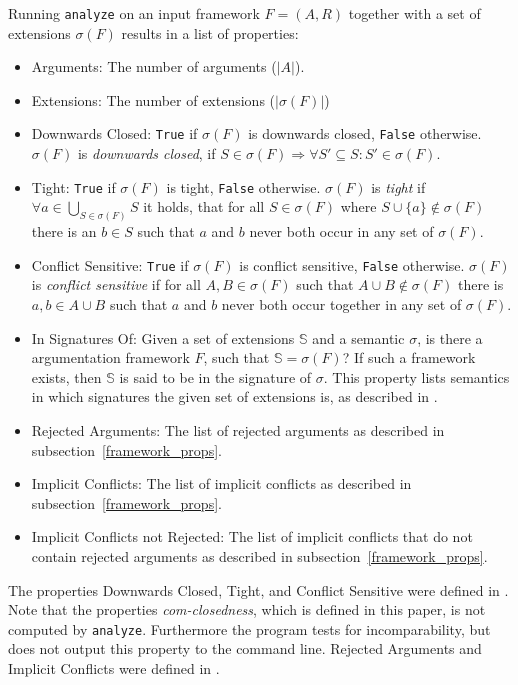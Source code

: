 \documentclass[parskip=half]{scrartcl}
\begin{document}
Running \texttt{analyze} on an input framework $F=(A,R)$ together with a set of
extensions $\sigma(F)$ results in a list of properties:
\begin{itemize}
  \item Arguments: The number of arguments ($|A|$).
  \item Extensions:	The number of extensions ($|\sigma(F)|$)
  \item Downwards Closed:	\texttt{True} if $\sigma(F)$ is downwards closed,
      \texttt{False} otherwise.  $\sigma(F)$ is \emph{downwards closed}, if $S
      \in \sigma(F)\Rightarrow \forall S'\subseteq S: S'\in\sigma(F)$.
  \item Tight: \texttt{True} if $\sigma(F)$ is tight, \texttt{False}
      otherwise.  $\sigma(F)$ is \emph{tight} if $\forall
      a\in\bigcup_{S\in\sigma(F)}S$ it holds, that for all $S\in\sigma(F)$ where
      $S\cup\{a\}\notin\sigma(F)$ there is an $b\in S$ such that $a$ and $b$
      never both occur in any set of $\sigma(F)$.
  \item Conflict Sensitive: \texttt{True} if $\sigma(F)$ is conflict sensitive,
      \texttt{False} otherwise.  $\sigma(F)$ is \emph{conflict sensitive} if for
      all $A, B\in\sigma(F)$ such that $A\cup B\notin\sigma(F)$ there is $a,
      b\in A\cup B$ such that $a$ and $b$ never both occur together in any set of
      $\sigma(F)$.
  \item In Signatures Of: Given a set of extensions $\mathbb{S}$ and a semantic
      $\sigma$, is there a argumentation framework $F$, such that $\mathbb{S} =
      \sigma(F)$? If such a framework exists, then $\mathbb{S}$ is said to be in
      the signature of $\sigma$. This property lists semantics in which
      signatures the given set of extensions is, as described in
      \cite{dunne2015characteristics}.
  \item Rejected Arguments: The list of rejected arguments as described in
      subsection~\ref{framework_props}.
  \item Implicit Conflicts: The list of implicit conflicts as described in
      subsection~\ref{framework_props}.
  \item Implicit Conflicts not Rejected: The list of implicit conflicts that do
      not contain rejected arguments as described in
      subsection~\ref{framework_props}.
\end{itemize}

The properties Downwards Closed, Tight, and Conflict Sensitive were
defined in \cite{dunne2015characteristics}. Note that the properties
\emph{com-closedness}, which is defined in this paper, is not
computed by \texttt{analyze}. Furthermore the program tests for
incomparability, but does not output this property to the command line.
Rejected Arguments and Implicit Conflicts were defined in
\cite{baumann2016}.
\end{document}
